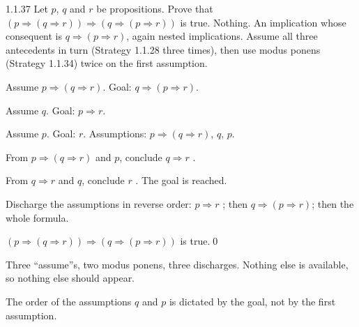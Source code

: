 \begin{bookex}[recommended]{1.1.37}
Let $p$, $q$ and $r$ be propositions. Prove that $(p\Rightarrow(q\Rightarrow r))\Rightarrow(q\Rightarrow(p\Rightarrow r))$ is true.
\solution
\given Nothing.
\goal An implication whose consequent is $q\Rightarrow(p\Rightarrow r)$, again nested implications.
\plan Assume all three antecedents in turn (Strategy 1.1.28 three times), then use modus ponens (Strategy 1.1.34) twice on the first assumption.
\begin{steps}
\item Assume $p\Rightarrow(q\Rightarrow r)$. Goal: $q\Rightarrow(p\Rightarrow r)$.
\item Assume $q$. Goal: $p\Rightarrow r$.
\item Assume $p$. Goal: $r$. Assumptions: $p\Rightarrow(q\Rightarrow r)$, $q$, $p$.
\item From $p\Rightarrow(q\Rightarrow r)$ and $p$, conclude $q\Rightarrow r$ .
\item From $q\Rightarrow r$ and $q$, conclude $r$ . The goal is reached.
\item Discharge the assumptions in reverse order: $p\Rightarrow r$ ; then $q\Rightarrow(p\Rightarrow r)$; then the whole formula.
\end{steps}
\conclusion $(p\Rightarrow(q\Rightarrow r))\Rightarrow(q\Rightarrow(p\Rightarrow r))$ is true.\qed
\begin{compare}
\item Three ``assume''s, two modus ponens, three discharges. Nothing else is available, so nothing else should appear.
\item The order of the assumptions $q$ and $p$ is dictated by the goal, not by the first assumption.
\end{compare}
\end{bookex}

